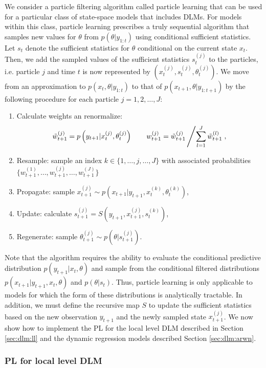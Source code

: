 We consider a particle filtering algorithm called particle learning \citep{Carv:Joha:Lope:Pols:part} that can be used for a particular class of state-space models that includes DLMs. For models within this class, particle learning prescribes a truly sequential algorithm that samples new values for $\theta$ from $p(\theta|y_{1:t})$ using conditional sufficient statistics. Let $s_t$ denote the sufficient statistics for $\theta$ conditional on the current state $x_t$. Then, we add the sampled values of the sufficient statistics $s_t^{(j)}$ to the particles, i.e. particle $j$ and time $t$ is now represented by $\left(x_t^{(j)},s_t^{(j)},\theta_t^{(j)}\right)$. We move from an approximation to $p(x_t,\theta|y_{1:t})$ to that of $p(x_{t+1},\theta|y_{1:t+1})$ by the following procedure for each particle $j = 1,2,\ldots,J$:
\begin{enumerate}
\item Calculate weights an renormalize:
    \[\tilde{w}_{t+1}^{(j)} = p\left(y_{t+1}|x_t^{(j)},\theta_t^{(j)}\right) \qquad w_{t+1}^{(j)} = \tilde{w}_{t+1}^{(j)} \left/ \sum_{l=1}^J \tilde{w}_{t+1}^{(l)}\right.,\]
\item Resample: sample an index $k \in \{1,\ldots,j,\ldots,J\}$ with associated probabilities $\{w_{t+1}^{(1)},\ldots,w_{t+1}^{(j)},\ldots,w_{t+1}^{(J)}\}$
\item Propagate: sample $x_{t+1}^{(j)} \sim p\left(x_{t+1}|y_{t+1},x_t^{(k)},\theta_t^{(k)}\right)$,
\item Update: calculate $s_{t+1}^{(j)} = S\left(y_{t+1},x_{t+1}^{(j)},s_t^{(k)}\right)$,
\item Regenerate: sample $\theta_{t+1}^{(j)} \sim p\left(\theta|s_{t+1}^{(j)}\right)$.
\end{enumerate}
Note that the algorithm requires the ability to evaluate the conditional predictive distribution $p(y_{t+1}|x_t,\theta)$ and sample from the conditional filtered distributions $p(x_{t+1}|y_{t+1},x_t,\theta)$ and $p(\theta|s_t)$. Thus, particle learning is only applicable to models for which the form of these distributions is analytically tractable. In addition, we must define the recursive map $S$ to update the sufficient statistics based on the new observation $y_{t+1}$ and the newly sampled state $x_{t+1}^{(j)}$. We now show how to implement the PL for the local level DLM described in Section \ref{sec:dlm:ll} and the dynamic regression models described Section \ref{sec:dlm:arwn}.

\subsubsection{PL for local level DLM}

